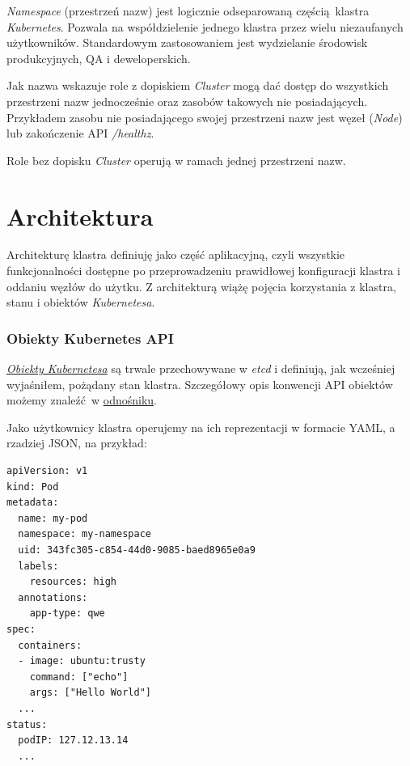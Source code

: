 \documentclass[a4paper,12pt,twoside,openany]{report}
\begin{document}
\emph{Namespace} (przestrzeń nazw) jest logicznie odseparowaną
częścią~klastra \emph{Kubernetes}. Pozwala na współdzielenie jednego
klastra przez wielu niezaufanych użytkowników. Standardowym
zastosowaniem jest wydzielanie środowisk produkcyjnych, QA i
deweloperskich.

Jak nazwa wskazuje role z dopiskiem \emph{Cluster} mogą dać dostęp do
wszystkich przestrzeni nazw jednocześnie oraz zasobów takowych nie
posiadających. Przykładem zasobu nie posiadającego swojej przestrzeni
nazw jest węzeł (\emph{Node}) lub zakończenie API \emph{/healthz}.

Role bez dopisku \emph{Cluster} operują w ramach jednej przestrzeni
nazw.

\hypertarget{architektura}{%
\section{Architektura}\label{architektura}}

Architekturę klastra definiuję jako część aplikacyjną, czyli wszystkie
funkcjonalności dostępne po przeprowadzeniu prawidłowej konfiguracji
klastra i oddaniu węzłów do użytku. Z architekturą wiążę pojęcia
korzystania z klastra, stanu i obiektów \emph{Kubernetesa}.

\hypertarget{obiekty-kubernetes-api}{%
\subsubsection{Obiekty Kubernetes API}\label{obiekty-kubernetes-api}}

\href{https://kubernetes.io/docs/concepts/overview/working-with-objects/kubernetes-objects/}{\emph{Obiekty
Kubernetesa}} są trwale przechowywane w \emph{etcd} i definiują, jak
wcześniej wyjaśniłem, pożądany stan klastra. Szczegółowy opis konwencji
API obiektów możemy znaleźć~w
\href{https://github.com/kubernetes/community/blob/master/contributors/devel/api-conventions.md}{odnośniku}.

Jako użytkownicy klastra operujemy na ich reprezentacji w formacie YAML,
a rzadziej JSON, na przykład:

\begin{lstlisting}
apiVersion: v1
kind: Pod
metadata:
  name: my-pod 
  namespace: my-namespace
  uid: 343fc305-c854-44d0-9085-baed8965e0a9
  labels:
    resources: high
  annotations:
    app-type: qwe
spec:
  containers:
  - image: ubuntu:trusty
    command: ["echo"]
    args: ["Hello World"]
  ...
status:
  podIP: 127.12.13.14
  ...
\end{lstlisting}
\end{document}
